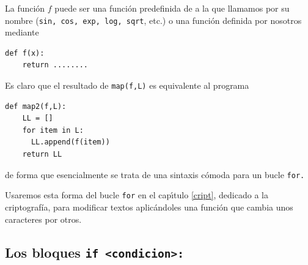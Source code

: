La funci\'on $f$ puede ser una funci\'on predefinida de {\sage} a la que
llamamos por su nombre ({\tt sin,\ cos,\ exp,\ log,\ sqrt}, etc.) o una 
funci\'on
definida por nosotros mediante 
\begin{lstlisting}
def f(x):
    return ........
\end{lstlisting}

Es claro que el resultado de \lstinline|map(f,L)| es equivalente al programa
\begin{lstlisting}
def map2(f,L):
    LL = []
    for item in L:
      LL.append(f(item))
    return LL
\end{lstlisting}
\noindent de forma que esencialmente se trata de una sintaxis c\'omoda para un
bucle {\tt for.}

Usaremos esta forma del bucle {\tt for} en el cap\'{\i}tulo \ref{cript},
dedicado a la criptograf\'{i}a, para modificar textos aplic\'andoles una
funci\'on que cambia unos caracteres por otros.






\subsection{Los bloques \lstinline|if <condicion>:|}

